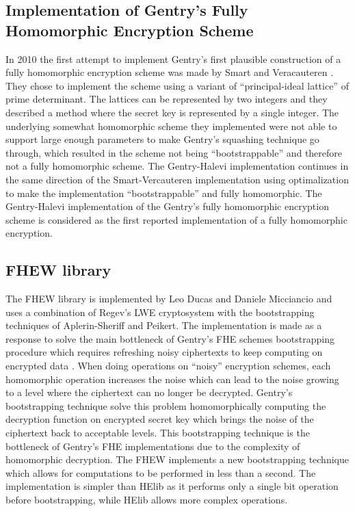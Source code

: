 \subsection{Implementation of Gentry's Fully Homomorphic Encryption Scheme}
 In 2010 the first attempt to implement Gentry's first plausible construction of a fully homomorphic encryption scheme \cite{gen09b} was made by Smart and Veracauteren \cite{smartver}. They chose to implement the scheme using a variant of ``principal-ideal lattice'' of prime determinant. The lattices can be represented by two integers and they described a method where the secret key is represented by a single integer. The underlying somewhat homomorphic scheme they implemented were not able to support large enough parameters to make Gentry's squashing technique go through, which resulted in the scheme not being ``bootstrappable'' and therefore not a fully homomorphic scheme. The Gentry-Halevi implementation continues in the same direction of the Smart-Vercauteren implementation using optimalization to make the implementation ``bootstrappable'' and fully homomorphic. The Gentry-Halevi implementation of the Gentry's fully homomorphic encryption scheme is considered as the first reported implementation of a fully homomorphic encryption.

\subsection{FHEW library}
The FHEW library is implemented by Leo Ducas and Daniele Micciancio and uses a combination of Regev's LWE cryptosystem with the bootstrapping techniques of Aplerin-Sheriff and Peikert\cite{cryptoeprint:2014:094}. The implementation is made as a response to solve the main bottleneck of Gentry's FHE schemes bootstrapping procedure which requires refreshing noisy ciphertexts to keep computing on encrypted data \cite{ducas2015fhew}. When doing operations on ``noisy'' encryption schemes, each homomorphic operation increases the noise which can lead to the noise growing to a level where the ciphertext can no longer be decrypted. Gentry's bootstrapping technique solve this problem homomorphically computing the decryption function on encrypted secret key which brings the noise of the ciphertext back to acceptable levels. This bootstrapping technique is the bottleneck of Gentry's FHE implementations due to the complexity of homomorphic decryption. The FHEW implements a new bootstrapping technique which allows for computations to be performed in less than a second. The implementation is simpler than HElib as it performs only a single bit operation before bootstrapping, while HElib allows more complex operations\cite{ducas2015fhew}.

